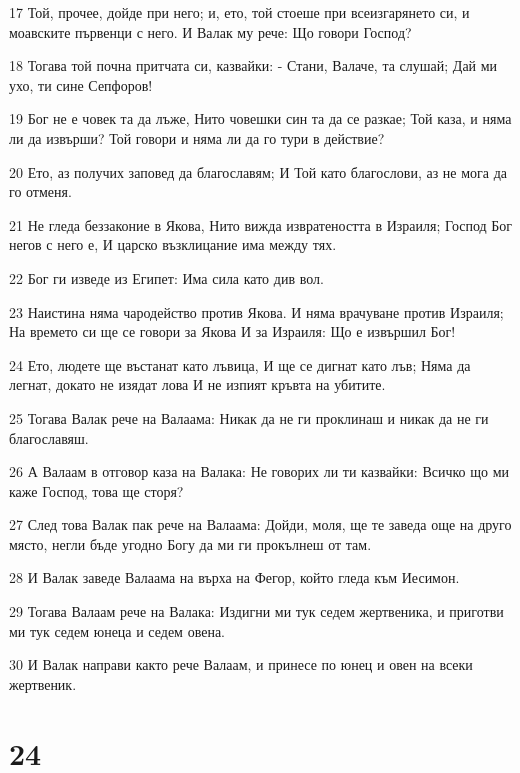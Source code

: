 \par 17 Той, прочее, дойде при него; и, ето, той стоеше при всеизгарянето си, и моавските първенци с него. И Валак му рече: Що говори Господ?
\par 18 Тогава той почна притчата си, казвайки: - Стани, Валаче, та слушай; Дай ми ухо, ти сине Сепфоров!
\par 19 Бог не е човек та да лъже, Нито човешки син та да се разкае; Той каза, и няма ли да извърши? Той говори и няма ли да го тури в действие?
\par 20 Ето, аз получих заповед да благославям; И Той като благослови, аз не мога да го отменя.
\par 21 Не гледа беззаконие в Якова, Нито вижда извратеността в Израиля; Господ Бог негов с него е, И царско възклицание има между тях.
\par 22 Бог ги изведе из Египет: Има сила като див вол.
\par 23 Наистина няма чародейство против Якова. И няма врачуване против Израиля; На времето си ще се говори за Якова И за Израиля: Що е извършил Бог!
\par 24 Ето, людете ще въстанат като лъвица, И ще се дигнат като лъв; Няма да легнат, докато не изядат лова И не изпият кръвта на убитите.
\par 25 Тогава Валак рече на Валаама: Никак да не ги проклинаш и никак да не ги благославяш.
\par 26 А Валаам в отговор каза на Валака: Не говорих ли ти казвайки: Всичко що ми каже Господ, това ще сторя?
\par 27 След това Валак пак рече на Валаама: Дойди, моля, ще те заведа още на друго място, негли бъде угодно Богу да ми ги прокълнеш от там.
\par 28 И Валак заведе Валаама на върха на Фегор, който гледа към Иесимон.
\par 29 Тогава Валаам рече на Валака: Издигни ми тук седем жертвеника, и приготви ми тук седем юнеца и седем овена.
\par 30 И Валак направи както рече Валаам, и принесе по юнец и овен на всеки жертвеник.

\chapter{24}

